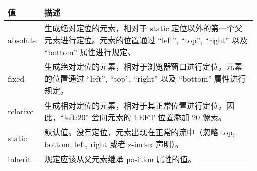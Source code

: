 \begin{longtable}[]{@{}ll@{}}
\toprule
\begin{minipage}[b]{0.49\columnwidth}\raggedright\strut
值\strut
\end{minipage} & \begin{minipage}[b]{0.44\columnwidth}\raggedright\strut
描述\strut
\end{minipage}\tabularnewline
\midrule
\endhead
\begin{minipage}[t]{0.49\columnwidth}\raggedright\strut
absolute\strut
\end{minipage} & \begin{minipage}[t]{0.44\columnwidth}\raggedright\strut
生成绝对定位的元素，相对于 static
定位以外的第一个父元素进行定位。元素的位置通过 ``left'', ``top'',
``right'' 以及 ``bottom'' 属性进行规定。\strut
\end{minipage}\tabularnewline
\begin{minipage}[t]{0.49\columnwidth}\raggedright\strut
fixed\strut
\end{minipage} & \begin{minipage}[t]{0.44\columnwidth}\raggedright\strut
生成绝对定位的元素，相对于浏览器窗口进行定位。元素的位置通过 ``left'',
``top'', ``right'' 以及 ``bottom'' 属性进行规定。\strut
\end{minipage}\tabularnewline
\begin{minipage}[t]{0.49\columnwidth}\raggedright\strut
relative\strut
\end{minipage} & \begin{minipage}[t]{0.44\columnwidth}\raggedright\strut
生成相对定位的元素，相对于其正常位置进行定位。因此，``left:20''
会向元素的 LEFT 位置添加 20 像素。\strut
\end{minipage}\tabularnewline
\begin{minipage}[t]{0.49\columnwidth}\raggedright\strut
static\strut
\end{minipage} & \begin{minipage}[t]{0.44\columnwidth}\raggedright\strut
默认值。没有定位，元素出现在正常的流中（忽略 top, bottom, left, right
或者 z-index 声明）。\strut
\end{minipage}\tabularnewline
\begin{minipage}[t]{0.49\columnwidth}\raggedright\strut
inherit\strut
\end{minipage} & \begin{minipage}[t]{0.44\columnwidth}\raggedright\strut
规定应该从父元素继承 position 属性的值。\strut
\end{minipage}\tabularnewline
\bottomrule
\end{longtable}

